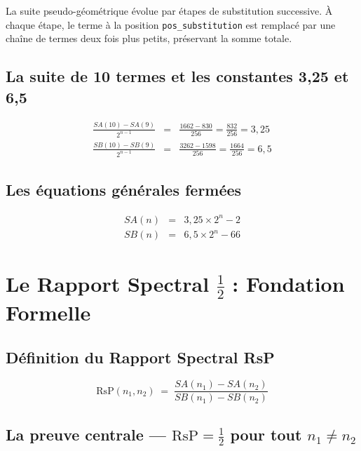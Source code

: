 \documentclass[]{pasj02}
\begin{document}
La suite pseudo-géométrique évolue par étapes de substitution successive.
À chaque étape, le terme à la position \texttt{pos\_substitution} est
remplacé par une chaîne de termes deux fois plus petits, préservant la somme
totale.

\subsection{La suite de 10 termes et les constantes 3,25 et 6,5}
\label{ssec:constantes}
\label{hol:constantes_savard}

\begin{eqnarray}
  \frac{SA(10)-SA(9)}{2^{n-1}} &=& \frac{1662-830}{256}
    = \frac{832}{256} = 3{,}25 \\
  \frac{SB(10)-SB(9)}{2^{n-1}} &=& \frac{3262-1598}{256}
    = \frac{1664}{256} = 6{,}5
\end{eqnarray}

\subsection{Les équations générales fermées}
\label{ssec:equations}
\label{hol:equations_fermees}
\begin{eqnarray}
  SA(n) &=& 3{,}25 \times 2^n - 2 \label{eq:SA}\\
  SB(n) &=& 6{,}5 \times 2^n - 66 \label{eq:SB}
\end{eqnarray}

\section{Le Rapport Spectral $\tfrac{1}{2}$ : Fondation Formelle}
\label{sec:rsp}

\subsection{Définition du Rapport Spectral RsP}
\label{ssec:rsp_def}
\label{hol:rsp_definition}

\begin{equation}
  \mathrm{RsP}(n_1,n_2) \;=\;
  \frac{SA(n_1)-SA(n_2)}{SB(n_1)-SB(n_2)}
\end{equation}

\subsection{La preuve centrale --- $\mathrm{RsP} = \tfrac{1}{2}$ pour tout
$n_1 \neq n_2$}
\label{ssec:preuve_centrale}
\label{hol:rsp_un_demi_general}
\end{document}
